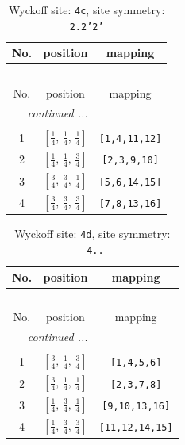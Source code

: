 \documentclass[fleqn,8pt]{jsarticle}
\begin{document}
\renewcommand{\arraystretch}{1.2}
\begin{longtable}{ccc}
\caption{Wyckoff site: {\tt 4c}, site symmetry: {\tt 2.2'2'}}
 \\
 \hline \hline
No. & position & mapping \\ \hline \endfirsthead

\multicolumn{2}{l}{\tablename\ \thetable{}} \\
 \hline \hline
No. & position & mapping \\ \hline \endhead

 \hline \hline
\multicolumn{2}{r}{\footnotesize\it continued ...} \\ \endfoot

 \hline \hline
\multicolumn{2}{r}{} \\ \endlastfoot

1 & $\left[ \frac{1}{4},\, \frac{1}{4},\, \frac{1}{4} \right]$ & {\tt [1,4,11,12]} \\ \hline
2 & $\left[ \frac{1}{4},\, \frac{1}{4},\, \frac{3}{4} \right]$ & {\tt [2,3,9,10]} \\ \hline
3 & $\left[ \frac{3}{4},\, \frac{3}{4},\, \frac{1}{4} \right]$ & {\tt [5,6,14,15]} \\ \hline
4 & $\left[ \frac{3}{4},\, \frac{3}{4},\, \frac{3}{4} \right]$ & {\tt [7,8,13,16]} \\
\end{longtable}
\renewcommand{\arraystretch}{1.2}
\begin{longtable}{ccc}
\caption{Wyckoff site: {\tt 4d}, site symmetry: {\tt -4..}}
 \\
 \hline \hline
No. & position & mapping \\ \hline \endfirsthead

\multicolumn{2}{l}{\tablename\ \thetable{}} \\
 \hline \hline
No. & position & mapping \\ \hline \endhead

 \hline \hline
\multicolumn{2}{r}{\footnotesize\it continued ...} \\ \endfoot

 \hline \hline
\multicolumn{2}{r}{} \\ \endlastfoot

1 & $\left[ \frac{3}{4},\, \frac{1}{4},\, \frac{3}{4} \right]$ & {\tt [1,4,5,6]} \\ \hline
2 & $\left[ \frac{3}{4},\, \frac{1}{4},\, \frac{1}{4} \right]$ & {\tt [2,3,7,8]} \\ \hline
3 & $\left[ \frac{1}{4},\, \frac{3}{4},\, \frac{1}{4} \right]$ & {\tt [9,10,13,16]} \\ \hline
4 & $\left[ \frac{1}{4},\, \frac{3}{4},\, \frac{3}{4} \right]$ & {\tt [11,12,14,15]} \\
\end{longtable}
\end{document}
